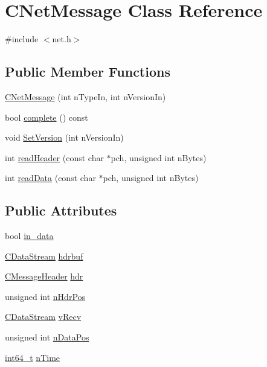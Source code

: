 \hypertarget{class_c_net_message}{}\section{C\+Net\+Message Class Reference}
\label{class_c_net_message}


{\ttfamily \#include $<$net.\+h$>$}

\subsection*{Public Member Functions}
\begin{DoxyCompactItemize}
\item 
\hyperlink{class_c_net_message_aa70db259a11e329ece8e9db4b895982c}{C\+Net\+Message} (int n\+Type\+In, int n\+Version\+In)
\item 
bool \hyperlink{class_c_net_message_a440150fa0e6a84699780048baca55da8}{complete} () const 
\item 
void \hyperlink{class_c_net_message_a63b9f2351d5e92126cacacd51d9e16b6}{Set\+Version} (int n\+Version\+In)
\item 
int \hyperlink{class_c_net_message_a3e58f5f29b23d1377f8fd15fc75c78ac}{read\+Header} (const char $\ast$pch, unsigned int n\+Bytes)
\item 
int \hyperlink{class_c_net_message_adbc1669a56462daea5f37e5e99117f8c}{read\+Data} (const char $\ast$pch, unsigned int n\+Bytes)
\end{DoxyCompactItemize}
\subsection*{Public Attributes}
\begin{DoxyCompactItemize}
\item 
bool \hyperlink{class_c_net_message_a8f399ad7225f980bdab3ede17b1b23af}{in\+\_\+data}
\item 
\hyperlink{class_c_data_stream}{C\+Data\+Stream} \hyperlink{class_c_net_message_a80a6f95f0c187aa97788118248cbf452}{hdrbuf}
\item 
\hyperlink{class_c_message_header}{C\+Message\+Header} \hyperlink{class_c_net_message_ae7215dca62862a3688f7eeb94646c377}{hdr}
\item 
unsigned int \hyperlink{class_c_net_message_a1a500121037490eec4b238906f3a23ad}{n\+Hdr\+Pos}
\item 
\hyperlink{class_c_data_stream}{C\+Data\+Stream} \hyperlink{class_c_net_message_a1a25c16099d01362e1663390a2e06d1a}{v\+Recv}
\item 
unsigned int \hyperlink{class_c_net_message_a418f59287d1805dda6959f27a170c855}{n\+Data\+Pos}
\item 
\hyperlink{stdint_8h_adec1df1b8b51cb32b77e5b86fff46471}{int64\+\_\+t} \hyperlink{class_c_net_message_a99d5bbca862ac4b7a88b71a7b679decc}{n\+Time}
\end{DoxyCompactItemize}


